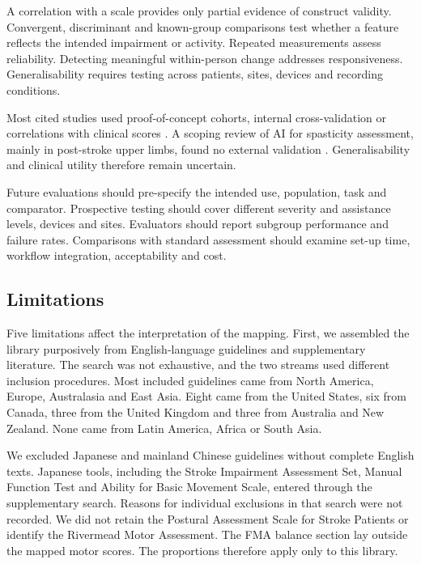\documentclass[11pt]{article}
\begin{document}
A correlation with a scale provides only partial evidence of construct validity. Convergent, discriminant and known-group comparisons test whether a feature reflects the intended impairment or activity. Repeated measurements assess reliability. Detecting meaningful within-person change addresses responsiveness. Generalisability requires testing across patients, sites, devices and recording conditions.

Most cited studies used proof-of-concept cohorts, internal cross-validation or correlations with clinical scores \cite{S3Lonini202235224426,Lee2021SmartphoneVideoAmbulation,Proffitt2023DepthMovement,Grimm2021KinematicValidation}. A scoping review of AI for spasticity assessment, mainly in post-stroke upper limbs, found no external validation \cite{Cao2026AISpasticity}. Generalisability and clinical utility therefore remain uncertain.

Future evaluations should pre-specify the intended use, population, task and comparator. Prospective testing should cover different severity and assistance levels, devices and sites. Evaluators should report subgroup performance and failure rates. Comparisons with standard assessment should examine set-up time, workflow integration, acceptability and cost.

\subsection{Limitations}
\label{sec:limitations}

Five limitations affect the interpretation of the mapping. First, we assembled the library purposively from English-language guidelines and supplementary literature. The search was not exhaustive, and the two streams used different inclusion procedures. Most included guidelines came from North America, Europe, Australasia and East Asia. Eight came from the United States, six from Canada, three from the United Kingdom and three from Australia and New Zealand. None came from Latin America, Africa or South Asia.

We excluded Japanese and mainland Chinese guidelines without complete English texts. Japanese tools, including the Stroke Impairment Assessment Set, Manual Function Test and Ability for Basic Movement Scale, entered through the supplementary search. Reasons for individual exclusions in that search were not recorded. We did not retain the Postural Assessment Scale for Stroke Patients or identify the Rivermead Motor Assessment. The FMA balance section lay outside the mapped motor scores. The proportions therefore apply only to this library.
\end{document}
